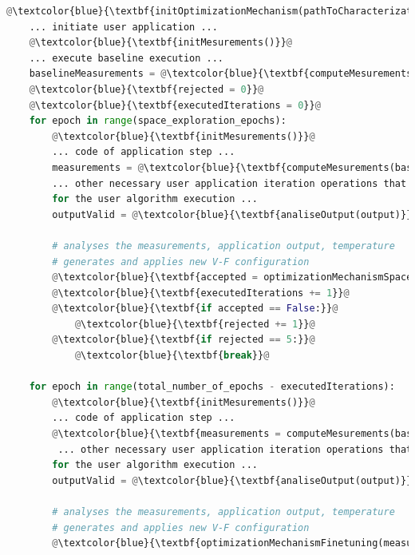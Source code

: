 \begin{lstlisting}[language=Python, caption=Usage example of the V-F Optimization Mechanism Library. Blue statements represents the added programming elements for the mechanism, label=lst:wrapper, basicstyle=\footnotesize\ttfamily,abovecaptionskip=0pt, captionpos=b,escapechar=@]
    @\textcolor{blue}{\textbf{initOptimizationMechanism(pathToCharacterizationResults)}}@
    ... initiate user application ...
    @\textcolor{blue}{\textbf{initMesurements()}}@
    ... execute baseline execution ...
    baselineMeasurements = @\textcolor{blue}{\textbf{computeMesurements()}}@
    @\textcolor{blue}{\textbf{rejected = 0}}@
    @\textcolor{blue}{\textbf{executedIterations = 0}}@
    for epoch in range(space_exploration_epochs):
        @\textcolor{blue}{\textbf{initMesurements()}}@
        ... code of application step ...
        measurements = @\textcolor{blue}{\textbf{computeMesurements(baselineMeasurements)}}@
        ... other necessary user application iteration operations that do not account
        for the user algorithm execution ...
        outputValid = @\textcolor{blue}{\textbf{analiseOutput(output)}}@
        
        # analyses the measurements, application output, temperature
        # generates and applies new V-F configuration
        @\textcolor{blue}{\textbf{accepted = optimizationMechanismSpaceExploration(measurements, outputValid)}}@
        @\textcolor{blue}{\textbf{executedIterations += 1}}@
        @\textcolor{blue}{\textbf{if accepted == False:}}@
            @\textcolor{blue}{\textbf{rejected += 1}}@
        @\textcolor{blue}{\textbf{if rejected == 5:}}@
            @\textcolor{blue}{\textbf{break}}@
    
    for epoch in range(total_number_of_epochs - executedIterations):
        @\textcolor{blue}{\textbf{initMesurements()}}@
        ... code of application step ...
        @\textcolor{blue}{\textbf{measurements = computeMesurements(baselineMeasurements)}}@
         ... other necessary user application iteration operations that do not account
        for the user algorithm execution ...
        outputValid = @\textcolor{blue}{\textbf{analiseOutput(output)}}@
        
        # analyses the measurements, application output, temperature
        # generates and applies new V-F configuration
        @\textcolor{blue}{\textbf{optimizationMechanismFinetuning(measurements, outputValid)}}@
\end{lstlisting}





